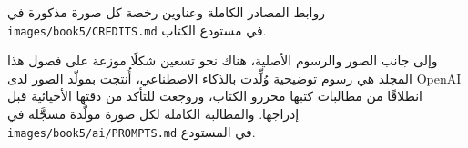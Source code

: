 روابط المصادر الكاملة وعناوين رخصة كل صورة مذكورة في
\texttt{images/\allowbreak book5/\allowbreak CREDITS.md} في مستودع الكتاب.

\bigskip
وإلى جانب الصور والرسوم الأصلية، هناك نحو تسعين شكلًا موزعة على فصول
هذا المجلد هي رسوم توضيحية وُلِّدت بالذكاء الاصطناعي، أُنتجت بمولّد الصور
لدى OpenAI انطلاقًا من مطالبات كتبها محررو الكتاب، وروجعت للتأكد من
دقتها الأحيائية قبل إدراجها. والمطالبة الكاملة لكل صورة مولَّدة مسجَّلة في
\texttt{images/\allowbreak book5/\allowbreak ai/\allowbreak PROMPTS.md} في المستودع.
\par\endgroup
\clearpage
